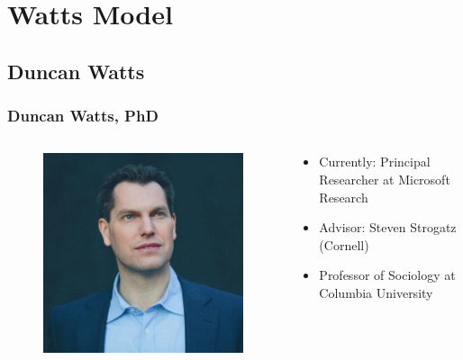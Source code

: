 \documentclass[compress]{beamer}
\begin{document}
\section{Watts Model}

\subsection{Duncan Watts}

    \begin{frame}[Basic2]\frametitle{Duncan Watts, PhD}
        \begin{columns}
            \begin{column}{0.4\textwidth}
                \begin{figure}
                    \centering
                    \includegraphics[width=0.8\linewidth]{../figures/watts_twitter}
                    \caption{}
                    \label{fig:wattstwitter}
                \end{figure}
            \end{column}
            \begin{column}{0.6\textwidth}
                \begin{itemize}
                    \footnotesize
                    \item Currently: Principal Researcher at Microsoft Research
                    \item Advisor: Steven Strogatz (Cornell)
                    \item Professor of Sociology at Columbia University
                    \begin{enumerate}

\end{enumerate}
\end{itemize}
\end{column}
\end{columns}
\end{frame}
\end{document}

